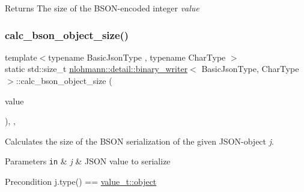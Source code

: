 \begin{DoxyReturn}{Returns}
The size of the B\+S\+O\+N-\/encoded integer {\itshape value} 
\end{DoxyReturn}
\mbox{\label{classnlohmann_1_1detail_1_1binary__writer_acc6f1cc1fd370ee84ebc8cf7b8712840}} 
\subsubsection{\texorpdfstring{calc\+\_\+bson\+\_\+object\+\_\+size()}{calc\_bson\_object\_size()}}
{\footnotesize\ttfamily template$<$typename Basic\+Json\+Type , typename Char\+Type $>$ \\
static std\+::size\+\_\+t \hyperlink{classnlohmann_1_1detail_1_1binary__writer}{nlohmann\+::detail\+::binary\+\_\+writer}$<$ Basic\+Json\+Type, Char\+Type $>$\+::calc\+\_\+bson\+\_\+object\+\_\+size (\begin{DoxyParamCaption}\item[{const typename Basic\+Json\+Type\+::object\+\_\+t \&}]{value }\end{DoxyParamCaption})\hspace{0.3cm}{\ttfamily [inline]}, {\ttfamily [static]}, {\ttfamily [private]}}



Calculates the size of the B\+S\+ON serialization of the given J\+S\+O\+N-\/object {\itshape j}. 


\begin{DoxyParams}[1]{Parameters}
\mbox{\tt in}  & {\em j} & J\+S\+ON value to serialize \\
\hline
\end{DoxyParams}
\begin{DoxyPrecond}{Precondition}
j.\+type() == \hyperlink{namespacenlohmann_1_1detail_a1ed8fc6239da25abcaf681d30ace4985aa8cfde6331bd59eb2ac96f8911c4b666}{value\+\_\+t\+::object} 
\end{DoxyPrecond}
\mbox{\label{classnlohmann_1_1detail_1_1binary__writer_aea44fd97a5cb9b4f175e66e3e4fdf158}} 
